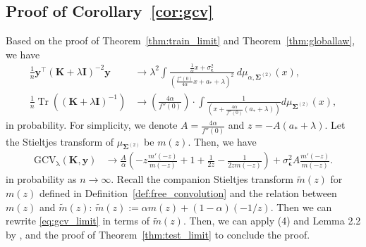 \documentclass[twoside,11pt]{article}
\newcommand{\by}{\boldsymbol{y}}
\newcommand{\bepsilon}{\boldsymbol{\epsilon}}
\def\bI{{\mathbf I}}
\def\bK{{\boldsymbol K}}
\def\by{{\boldsymbol y}}
\def\bSigma{{\boldsymbol \Sigma}}
\renewcommand{\bK}{\boldsymbol{K}}
\newcommand{\Tr}{\operatorname{Tr}}
\newcommand{\1}{\mathbf{1}}
\begin{document}
\subsection{Proof of Corollary~\ref{cor:gcv}}
    Based on the proof of Theorem~\ref{thm:train_limit} and Theorem~\ref{thm:globallaw}, we have
    \begin{align}
      \frac{1}{n}\by^\top (\bK+\lambda \bI)^{-2} \by&\to \lambda^2\int \frac{\frac{1}{\alpha} x+\sigma_{\bepsilon}^2}{\left(\frac{f''(0)}{4\alpha}x+a_*+\lambda\right)^2}~d\mu_{\alpha,\bSigma^{(2)}}(x),\\
        \frac{1}{n}\Tr ((\bK+\lambda \bI)^{-1}) &\to \left(\frac{4\alpha}{f''(0)}\right) \cdot \int \frac{1}{(x+\frac{4\alpha}{f''(0)}(a_*+\lambda))}d\mu_{\bSigma^{(2)}}( x),
    \end{align}
    in probability. For simplicity, we denote $A=\frac{4\alpha}{f''(0)}$ and $z = -A(a_*+\lambda)$. Let the Stieltjes transform of $\mu_{\bSigma^{(2)}}$ be $m(z)$. Then, we have
    \begin{align}
        \mathrm{GCV_{\lambda}(\bK,\by)}&\to \frac{A}{\alpha}\left(-z\frac{m'(-z)}{m(-z)}+1+\frac{1}{2z}-\frac{1}{2zm(-z)}\right)+\sigma_{\bepsilon}^2A \frac{m'(-z)}{m(-z)}.\label{eq:gcv_limit}
    \end{align} in probability as $n\to\infty$. Recall the companion Stieltjes transform $\widetilde m(z)$ for $m(z)$ defined in Definition~\ref{def:free_convolution} and the relation between $m(z)$ and $\widetilde m(z)$: $\widetilde m(z):=\alpha m(z)+(1-\alpha)(-1/z).$
Then we can rewrite \eqref{eq:gcv_limit} in terms of $\widetilde m(z)$.
Then, we can apply (4) and Lemma 2.2 by \cite{dobriban2018high}, and the proof of Theorem~\ref{thm:test_limit} to conclude the proof.



\end{document}
